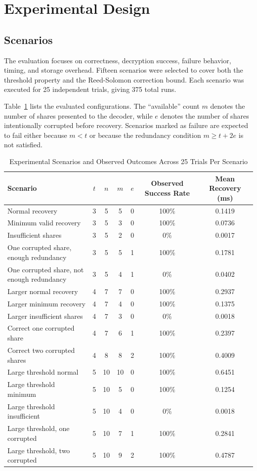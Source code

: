 \section{Experimental Design}

\subsection{Scenarios}

The evaluation focuses on correctness, decryption success, failure behavior, timing, and storage overhead. Fifteen scenarios were selected to cover both the threshold property and the Reed-Solomon correction bound. Each scenario was executed for 25 independent trials, giving 375 total runs.

Table~\ref{tab:scenarios} lists the evaluated configurations. The ``available'' count $m$ denotes the number of shares presented to the decoder, while $e$ denotes the number of shares intentionally corrupted before recovery. Scenarios marked as failure are expected to fail either because $m < t$ or because the redundancy condition $m \geq t + 2e$ is not satisfied.

\begin{table}[!t]
\caption{Experimental Scenarios and Observed Outcomes Across 25 Trials Per Scenario}
\label{tab:scenarios}
\centering
\scriptsize
\begin{tabular}{p{2.7in}cccccc}
\toprule
\textbf{Scenario} & \textbf{$t$} & \textbf{$n$} & \textbf{$m$} & \textbf{$e$} & \textbf{Observed Success Rate} & \textbf{Mean Recovery (ms)} \\
\midrule
Normal recovery & 3 & 5 & 5 & 0 & 100\% & 0.1419 \\
Minimum valid recovery & 3 & 5 & 3 & 0 & 100\% & 0.0736 \\
Insufficient shares & 3 & 5 & 2 & 0 & 0\% & 0.0017 \\
One corrupted share, enough redundancy & 3 & 5 & 5 & 1 & 100\% & 0.1781 \\
One corrupted share, not enough redundancy & 3 & 5 & 4 & 1 & 0\% & 0.0402 \\
Larger normal recovery & 4 & 7 & 7 & 0 & 100\% & 0.2937 \\
Larger minimum recovery & 4 & 7 & 4 & 0 & 100\% & 0.1375 \\
Larger insufficient shares & 4 & 7 & 3 & 0 & 0\% & 0.0018 \\
Correct one corrupted share & 4 & 7 & 6 & 1 & 100\% & 0.2397 \\
Correct two corrupted shares & 4 & 8 & 8 & 2 & 100\% & 0.4009 \\
Large threshold normal & 5 & 10 & 10 & 0 & 100\% & 0.6451 \\
Large threshold minimum & 5 & 10 & 5 & 0 & 100\% & 0.1254 \\
Large threshold insufficient & 5 & 10 & 4 & 0 & 0\% & 0.0018 \\
Large threshold, one corrupted & 5 & 10 & 7 & 1 & 100\% & 0.2841 \\
Large threshold, two corrupted & 5 & 10 & 9 & 2 & 100\% & 0.4787 \\
\bottomrule
\end{tabular}
\end{table}

